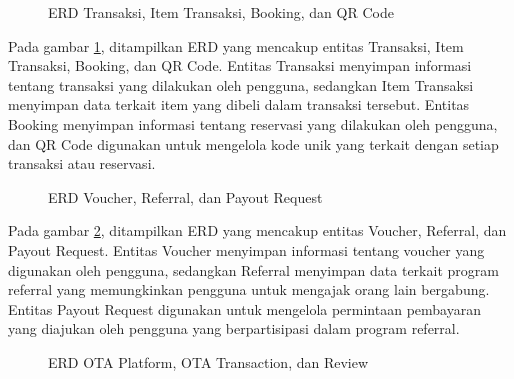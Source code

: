 \begin{figure}[H] %
    \centering
    \caption{ERD Transaksi, Item Transaksi, Booking, dan QR Code}
    \label{fig:erd_3} %
\end{figure}

Pada gambar \ref{fig:erd_3}, ditampilkan ERD yang mencakup entitas Transaksi, Item Transaksi, Booking, dan QR Code. Entitas Transaksi menyimpan informasi tentang transaksi yang dilakukan oleh pengguna, sedangkan Item Transaksi menyimpan data terkait item yang dibeli dalam transaksi tersebut. Entitas Booking menyimpan informasi tentang reservasi yang dilakukan oleh pengguna, dan QR Code digunakan untuk mengelola kode unik yang terkait dengan setiap transaksi atau reservasi.

\begin{figure}[H] %
    \centering
    \caption{ERD Voucher, Referral, dan Payout Request }
    \label{fig:erd_4} %
\end{figure}

Pada gambar \ref{fig:erd_4}, ditampilkan ERD yang mencakup entitas Voucher, Referral, dan Payout Request. Entitas Voucher menyimpan informasi tentang voucher yang digunakan oleh pengguna, sedangkan Referral menyimpan data terkait program referral yang memungkinkan pengguna untuk mengajak orang lain bergabung. Entitas Payout Request digunakan untuk mengelola permintaan pembayaran yang diajukan oleh pengguna yang berpartisipasi dalam program referral.

\begin{figure}[H] %
    \centering
    \caption{ERD OTA Platform, OTA Transaction, dan Review }
    \label{fig:erd_5} %
\end{figure}

